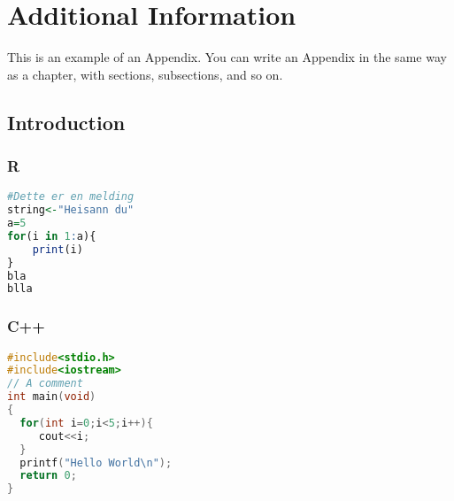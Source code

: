 
\chapter{Additional Information}
This is an example of an Appendix. You can write an Appendix in the same way as a chapter, with sections, subsections, and so on.

\section{Introduction}

\subsection{R}
\lstset{style=mystyleR}
\begin{lstlisting}[language=R]
#Dette er en melding 
string<-"Heisann du"
a=5
for(i in 1:a){
	print(i)
}
bla
blla
\end{lstlisting}



\subsection{C++}
\lstset{style=mystyleCpp} 
\begin{lstlisting}[language=C++]
#include<stdio.h>
#include<iostream>
// A comment
int main(void)
{
  for(int i=0;i<5;i++){
     cout<<i;
  }
  printf("Hello World\n");
  return 0;
}
\end{lstlisting}